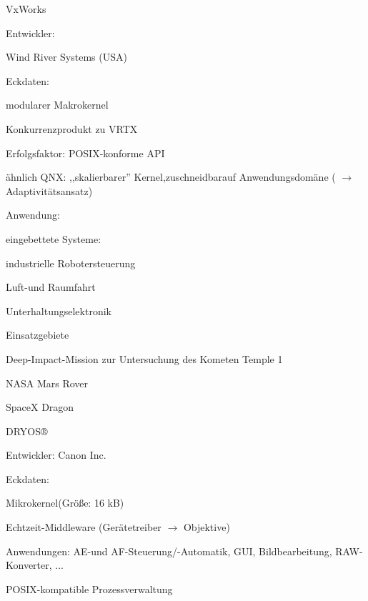 \documentclass[a4paper]{article}
\begin{document}
\begin{multicols}{3}
    VxWorks

    \begin{itemize*}
        \item Entwickler:
        \begin{itemize*}
            \item Wind River Systems (USA)
        \end{itemize*}
        \item Eckdaten:
        \begin{itemize*}
            \item modularer Makrokernel
            \item Konkurrenzprodukt zu VRTX
            \item Erfolgsfaktor: POSIX-konforme API
            \item ähnlich QNX: ,,skalierbarer'' Kernel,zuschneidbarauf Anwendungsdomäne ( $\rightarrow$ Adaptivitätsansatz)
        \end{itemize*}
        \item Anwendung:
        \begin{itemize*}
            \item eingebettete Systeme:
            \item industrielle Robotersteuerung
            \item Luft-und Raumfahrt
            \item Unterhaltungselektronik
        \end{itemize*}
        \item Einsatzgebiete
        \begin{itemize*}
            \item Deep-Impact-Mission zur Untersuchung des Kometen Temple 1
            \item NASA Mars Rover
            \item SpaceX Dragon
        \end{itemize*}
    \end{itemize*}

    DRYOS®

    \begin{itemize*}
        \item Entwickler: Canon Inc.
        \item Eckdaten:
        \begin{itemize*}
            \item Mikrokernel(Größe: 16 kB)
            \item Echtzeit-Middleware (Gerätetreiber $\rightarrow$ Objektive)
            \item Anwendungen: AE-und AF-Steuerung/-Automatik, GUI, Bildbearbeitung, RAW-Konverter, ...
            \item POSIX-kompatible Prozessverwaltung
        \end{itemize*}
    \end{itemize*}


\end{multicols}
\end{document}
